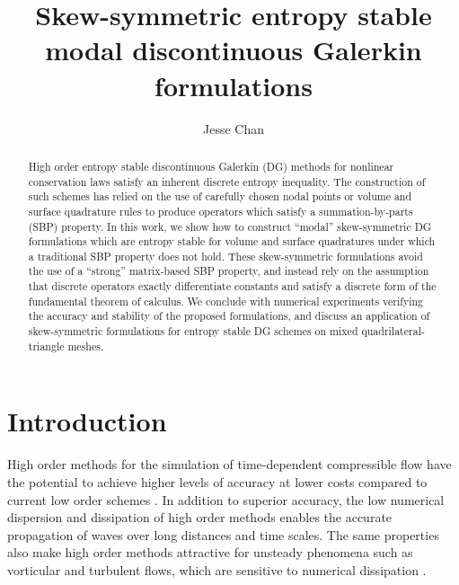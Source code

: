 \documentclass{svjour3}                     %
\date{}
\author{Jesse Chan}
\title{Skew-symmetric entropy stable modal discontinuous Galerkin formulations}%
\begin{document}


\maketitle

\begin{abstract}
High order entropy stable discontinuous Galerkin (DG) methods for nonlinear conservation laws satisfy an inherent discrete entropy inequality.  The construction of such schemes has relied on the use of carefully chosen nodal points \cite{gassner2013skew, fisher2013high, carpenter2014entropy, crean2018entropy, chan2018efficient} or volume and surface quadrature rules \cite{chan2017discretely, chan2018discretely} to produce operators which satisfy a summation-by-parts (SBP) property.  In this work, we show how to construct ``modal'' skew-symmetric DG formulations which are entropy stable for volume and surface quadratures under which a traditional SBP property does not hold.  These skew-symmetric formulations avoid the use of a ``strong'' matrix-based SBP property, and instead rely on the assumption that discrete operators exactly differentiate constants and satisfy a discrete form of the fundamental theorem of calculus.   We conclude with numerical experiments verifying the accuracy and stability of the proposed formulations, and discuss an application of skew-symmetric formulations for entropy stable DG schemes on mixed quadrilateral-triangle meshes.  
\end{abstract}


\section{Introduction}

High order methods for the simulation of time-dependent compressible flow have the potential to achieve higher levels of accuracy at lower costs compared to current low order schemes \cite{wang2013high}.  In addition to superior accuracy, the low numerical dispersion and dissipation of high order methods \cite{ainsworth2004dispersive} enables the accurate propagation of waves over long distances and time scales.  The same properties also make high order methods attractive for unsteady phenomena such as vorticular and turbulent flows, which are sensitive to numerical dissipation \cite{visbal1999high, wang2013high}.  
\end{document}
